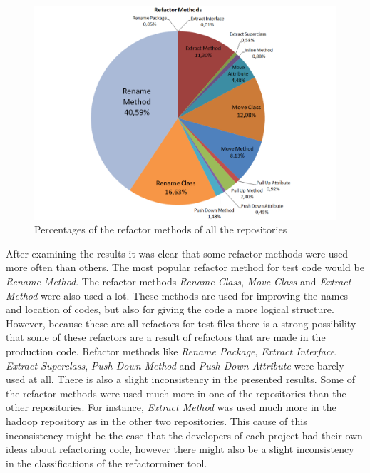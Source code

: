 \begin{figure}[!ht]
 \centering
 \includegraphics[width=\columnwidth]{resources/refactorMethods.pdf}
 \caption{Percentages of the refactor methods of all the repositories}
 \label{figure:piechart}
\end{figure}

After examining the results it was clear that some refactor methods were used more often than others. The most popular refactor method for test code would be \textit{Rename Method}. The refactor methods \textit{Rename Class}, \textit{Move Class} and \textit{Extract Method} were also used a lot. These methods are used for improving the names and location of codes, but also for giving the code a more logical structure. However, because these are all refactors for test files there is a strong possibility that some of these refactors are a result of refactors that are made in the production code. Refactor methods like \textit{Rename Package}, \textit{Extract Interface}, \textit{Extract Superclass}, \textit{Push Down Method} and \textit{Push Down Attribute} were barely used at all. There is also a slight inconsistency in the presented results. Some of the refactor methods were used much more in one of the repositories than the other repositories. For instance, \textit{Extract Method} was used much more in the hadoop repository as in the other two repositories. This cause of this inconsistency might be the case that the developers of each project had their own ideas about refactoring code, however there might also be a slight inconsistency in the classifications of the refactorminer tool.

